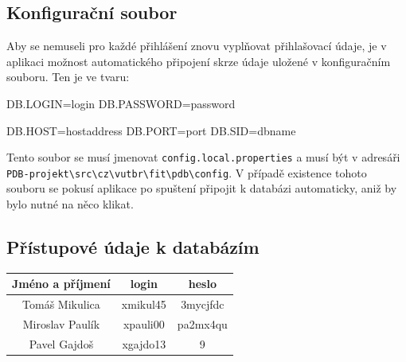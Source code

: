 \documentclass[11pt,a4paper]{article}
\begin{document}
 \subsection{Konfigurační soubor}\label{conf}
 Aby se nemuseli pro každé přihlášení znovu vyplňovat přihlašovací údaje, je v aplikaci možnost automatického připojení skrze údaje uložené v konfiguračním souboru. Ten je ve tvaru:
 \begin{center}
\begin{boxedverbatim}
DB.LOGIN=login
DB.PASSWORD=password

DB.HOST=hostaddress
DB.PORT=port
DB.SID=dbname
\end{boxedverbatim}
\end{center}
Tento soubor se musí jmenovat \texttt{config.local.properties} a musí být v adresáři \verb;PDB-projekt\src\cz\vutbr\fit\pdb\config;. V případě existence tohoto souboru se pokusí aplikace po spuštení připojit k databázi automaticky, aniž by bylo nutné na něco klikat.

\subsection{Přístupové údaje k databázím}

\begin{center}
  \begin{tabular}{ | c || c | c |}
  	\hline
  	Jméno a příjmení & login & heslo\\
    \hline\hline
    Tomáš Mikulica & xmikul45 & 3mycjfdc \\ \hline
    Miroslav Paulík & xpauli00 & pa2mx4qu \\ \hline
    Pavel Gajdoš & xgajdo13 & 9 \\
    \hline
  \end{tabular}
\end{center}
\end{document}
